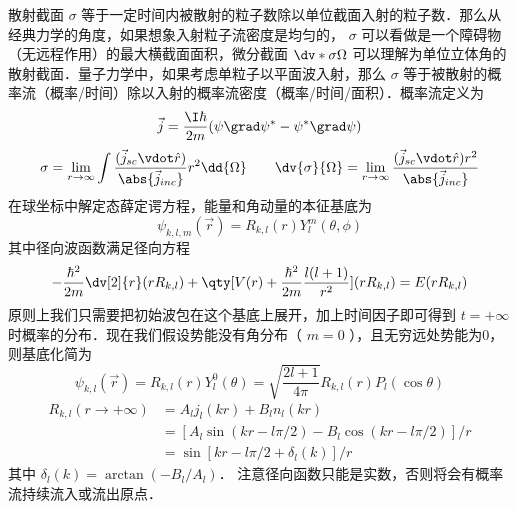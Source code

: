 
散射截面 $\sigma$ 等于一定时间内被散射的粒子数除以单位截面入射的粒子数．那么从经典力学的角度，如果想象入射粒子流密度是均匀的， $\sigma$ 可以看做是一个障碍物（无远程作用）的最大横截面面积，微分截面 $\dv*{\sigma}{\Omega}$ 可以理解为单位立体角的散射截面．量子力学中，如果考虑单粒子以平面波入射，那么 $\sigma$ 等于被散射的概率流（概率/时间）除以入射的概率流密度（概率/时间/面积）．概率流定义为
\begin{equation}
\vec j = \frac{\I\hbar }{2m}(\psi \grad \psi^* - \psi^* \grad \psi )
\end{equation}
\begin{equation}\label{ParWav_eq3}
\sigma  = \lim_{r \to \infty} \int \frac{(\vec j_{sc} \vdot \hat r)}{\abs{{\vec j}_{inc}}} r^2\dd{\Omega} 
\qquad
\dv{\sigma}{\Omega} = \lim_{r\to\infty} \frac{(\vec j_{sc} \vdot \hat r) r^2}{\abs{\vec j_{inc}}}
\end{equation}
在球坐标中解定态薛定谔方程，能量和角动量的本征基底为
\begin{equation}
\psi_{k,l,m}(\vec r) = R_{k,l}(r) Y_l^m(\theta, \phi )
\end{equation}
其中径向波函数满足径向方程
\begin{equation}\label{ParWav_eq4}
-\frac{\hbar^2}{2m} \dv[2]{r} (rR_{k,l}) + \qty[V(r) + \frac{\hbar^2}{2m} \frac{l(l + 1)}{r^2}](r R_{k,l}) = E(rR_{k,l})
\end{equation}
原则上我们只需要把初始波包在这个基底上展开，加上时间因子即可得到 $t =  + \infty$ 时概率的分布．现在我们假设势能没有角分布（ $m = 0$ ），且无穷远处势能为0，则基底化简为
\begin{equation}
\psi_{k,l}(\vec r) = R_{k,l}(r) Y_l^0(\theta ) = \sqrt{\frac{2l + 1}{4\pi }} R_{k,l}(r) P_l(\cos\theta)
\end{equation}
\begin{equation}\begin{aligned}\label{ParWav_eq6}
R_{k,l}(r \to + \infty) &= A_l j_l(kr) + B_l n_l(kr) \\
&= [A_l\sin(kr - l\pi /2) - B_l\cos(kr - l\pi /2)]/r \\
&= \sin [kr - l\pi /2 + \delta_l(k)]/r
\end{aligned}\end{equation}
其中 $\delta_l(k) = \arctan(- B_l/A_l)$． 注意径向函数只能是实数，否则将会有概率流持续流入或流出原点．

